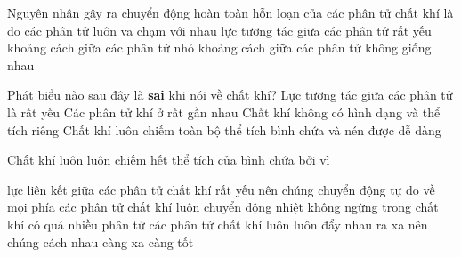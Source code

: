 \begin{ex}%
	Nguyên nhân gây ra chuyển động hoàn toàn hỗn loạn của các phân tử chất khí là do
	\choice
	{các phân tử luôn va chạm với nhau}
	{\True lực tương tác giữa các phân tử rất yếu}
	{khoảng cách giữa các phân tử nhỏ}
	{khoảng cách giữa các phân tử không giống nhau}
	\end{ex}
	\begin{ex}%
		Phát biểu nào sau đây là \textbf{sai} khi nói về chất khí?
		\choice
		{Lực tương tác giữa các phân tử là rất yếu}
		{\True Các phân tử khí ở rất gần nhau}
		{Chất khí không có hình dạng và thể tích riêng}
		{Chất khí luôn chiếm toàn bộ thể tích bình chứa và nén được dễ dàng}
		\end{ex}
		\begin{ex}%
			Chất khí luôn luôn chiếm hết thể tích của bình chứa bởi vì
			
			\choice
			{\True lực liên kết giữa các phân tử chất khí rất yếu nên chúng chuyển động tự do về mọi phía}
			{các phân tử chất khí luôn chuyển động nhiệt không ngừng}
			{trong chất khí có quá nhiều phân tử}
			{các phân tử chất khí luôn luôn đẩy nhau ra xa nên chúng cách nhau càng xa càng tốt}
			\end{ex}
